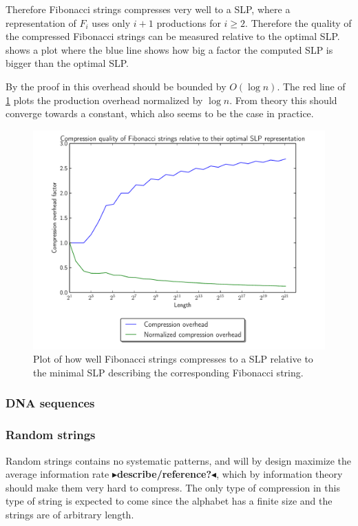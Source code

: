 \documentclass[twoside,11pt,openright]{report}
\newcommand{\todo}[1]{{\color[rgb]{.5,0,0}\textbf{$\blacktriangleright$#1$\blacktriangleleft$}}}
\begin{document}
Therefore Fibonacci strings compresses very well to a SLP, where a representation of $F_{i}$ uses only $i + 1$ productions for $i \geq 2$. Therefore the quality of the compressed Fibonacci strings can be measured relative to the optimal SLP.  shows a plot where the blue line shows how big a factor the computed SLP is bigger than the optimal SLP.

By the proof in \cite{Rytter2003211} this overhead should be bounded by $O(\log{n})$. The red line of \cref{fig:compression:quality:fibonacci} plots the production overhead normalized by $\log{n}$. From theory this should converge towards a constant, which also seems to be the case in practice.
%
\begin{figure}[h!]
  \centering
  \includegraphics[width=12cm]{compression/fib}
  \caption{Plot of how well Fibonacci strings compresses to a SLP relative to the minimal SLP describing the corresponding Fibonacci string.}
  \label{fig:compression:quality:fibonacci}
\end{figure}

\subsubsection{DNA sequences}

\subsubsection{Random strings}
Random strings contains no systematic patterns, and will by design maximize the average information rate \todo{describe/reference?}, which by information theory should make them very hard to compress. The only type of compression in this type of string is expected to come since the alphabet has a finite size and the strings are of arbitrary length.
\end{document}
